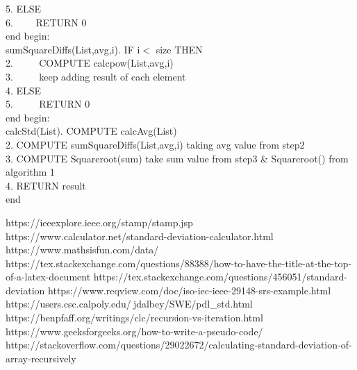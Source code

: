 \documentclass[a4paper,11pt]{article}
\begin{document}
\begin{titlepage}
\begin{algorithm}
5. ELSE\\
6. $\hspace{2em}$RETURN 0\\
end\newline
begin:\\
sumSquareDiffs(List,avg,i). IF i$<$ size THEN\\
2. $\hspace{2em}$ COMPUTE calcpow(List,avg,i) \\
3. $\hspace{2em}$ keep adding result of each element\\
4. ELSE\\
5. $\hspace{2em}$ RETURN 0\\
end\newline
begin:\\
calcStd(List). COMPUTE calcAvg(List)\\
2. COMPUTE sumSquareDiffs(List,avg,i) taking avg value from step2\\
3. COMPUTE Squareroot(sum) take sum value from step3 & Squareroot() from algorithm 1\\
4. RETURN result\\
end\newline
\end{algorithm}
\newpage



https://ieeexplore.ieee.org/stamp/stamp.jsp\newline
https://www.calculator.net/standard-deviation-calculator.html\newline
https://www.mathsisfun.com/data/\newline
https://tex.stackexchange.com/questions/88388/how-to-have-the-title-at-the-top-of-a-latex-document\newline
https://tex.stackexchange.com/questions/456051/standard-deviation\newline
https://www.reqview.com/doc/iso-iec-ieee-29148-srs-example.html\newline
https://users.csc.calpoly.edu/$~$jdalbey/SWE/pdl_std.html\newline
https://benpfaff.org/writings/clc/recursion-vs-iteration.html\newline
https://www.geeksforgeeks.org/how-to-write-a-pseudo-code/\newline
https://stackoverflow.com/questions/29022672/calculating-standard-deviation-of-array-recursively
\end{titlepage}
\end{document}
